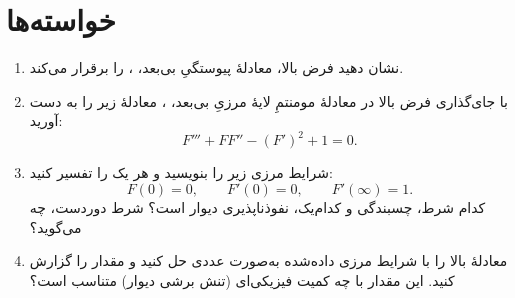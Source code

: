 \documentclass[12pt,a4paper]{article}
\begin{document}
\section{خواسته‌ها}
\begin{enumerate}
\item نشان دهید فرض بالا، معادلهٔ پیوستگیِ بی‌بعد،
،
را برقرار می‌کند.
\item با جای‌گذاری فرض بالا در معادلهٔ مومنتمِ لایهٔ مرزیِ بی‌بعد،
،
معادلهٔ زیر را به دست آورید:
\begin{equation}
F''' + F F'' - (F')^2 + 1 = 0.
\end{equation}
\item شرایط مرزی زیر را بنویسید و هر یک را تفسیر کنید:
\begin{equation}
F(0) = 0, \qquad F'(0) = 0, \qquad F'(\infty) = 1.
\end{equation}
کدام شرط، چسبندگی و کدام‌یک، نفوذناپذیری دیوار است؟ شرط دوردست،
چه می‌گوید؟
\item معادلهٔ بالا را با شرایط مرزی داده‌شده به‌صورت عددی حل کنید و
مقدار  را گزارش کنید. این مقدار با چه کمیت فیزیکی‌ای
(تنش برشی دیوار) متناسب است؟
\end{enumerate}
\end{document}
